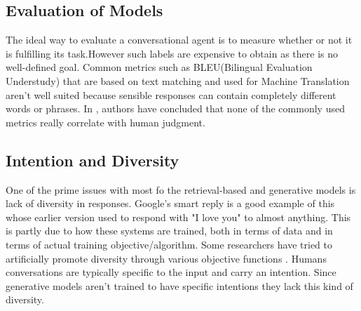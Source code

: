 \documentclass[letterpaper] {article} %
\begin{document}
\subsection{Evaluation of Models}
The ideal way to evaluate a conversational agent is to measure whether or not it is fulfilling its task.However such labels are expensive to obtain as there is no well-defined goal. Common metrics such as BLEU(Bilingual Evaluation Understudy) that are based on text matching and used for Machine Translation aren’t well suited because sensible responses can contain completely different words or phrases. In \cite{liu2016not}, authors have concluded that none of the commonly used metrics really correlate with human judgment.
\subsection{Intention and Diversity}
One of the prime issues with most fo the retrieval-based and generative models is lack of diversity in responses. Google's smart reply is a good example of this whose earlier version used to respond with "I love you" to almost anything. This is partly due to how these systems are trained, both in terms of data and in terms of actual training objective/algorithm.  Some researchers have tried to artificially promote diversity through various objective functions \cite{li2015diversity}. Humans conversations are typically specific to the input and carry an intention. Since generative models aren’t trained to have specific intentions they lack this kind of diversity.
\end{document}
